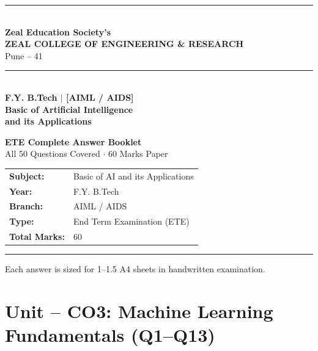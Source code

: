 \documentclass[12pt,a4paper]{article}
\begin{document}
\begin{titlepage}
\centering
\vspace*{1.5cm}
{\color{darkblue}\rule{\linewidth}{2pt}}\\[0.4cm]
{\large\color{darkblue}\textbf{Zeal Education Society's}}\\[0.2cm]
{\LARGE\bfseries\color{darkblue} ZEAL COLLEGE OF ENGINEERING \& RESEARCH}\\[0.1cm]
{\large\color{darkblue} Pune -- 41}\\[0.2cm]
{\color{darkblue}\rule{\linewidth}{0.8pt}}\\[1cm]

{\Large\bfseries\color{darkred} F.Y. B.Tech $|$ [AIML / AIDS]}\\[0.4cm]
{\LARGE\bfseries\color{darkblue} Basic of Artificial Intelligence}\\[0.2cm]
{\LARGE\bfseries\color{darkblue} and its Applications}\\[0.4cm]

\begin{tcolorbox}[colback=darkblue!10, colframe=darkblue, arc=6pt, width=0.75\textwidth]
  \centering
  {\large\bfseries ETE Complete Answer Booklet}\\[0.2cm]
  {\normalsize All 50 Questions Covered $\cdot$ 60 Marks Paper}
\end{tcolorbox}

\vspace{1.2cm}
\begin{tabular}{ll}
  \textbf{Subject:} & Basic of AI and its Applications \\[4pt]
  \textbf{Year:}    & F.Y. B.Tech \\[4pt]
  \textbf{Branch:}  & AIML / AIDS \\[4pt]
  \textbf{Type:}    & End Term Examination (ETE) \\[4pt]
  \textbf{Total Marks:} & 60 \\
\end{tabular}

\vspace{1.5cm}
{\color{darkblue}\rule{\linewidth}{2pt}}
\vfill
{\small\color{gray} Each answer is sized for 1--1.5 A4 sheets in handwritten examination.}
\end{titlepage}

\tableofcontents
\newpage

\section{Unit -- CO3: Machine Learning Fundamentals (Q1--Q13)}
\end{document}

